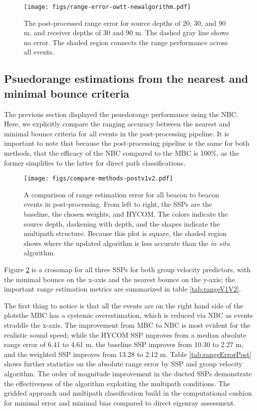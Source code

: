 \begin{figure}[!ht]
\texttt{[image: figs/range-error-owtt-newalgorithm.pdf]}
\caption{The post-processed range error for source depths of 20, 30, and 90 m, and receiver depths of 30 and 90 m. The dashed gray line shows no error. The shaded region connects the range performance across all events.}
\label{fig:rangeError}
\end{figure}

\FloatBarrier
\subsection{Psuedorange estimations from the nearest and minimal bounce criteria}

The previous section displayed the psuedorange performance using the NBC.
Here, we explicitly compare the ranging accuracy between the nearest and minimal bounce criteria for all events in the post-processing pipeline.
It is important to note that because the post-processing pipeline is the same for both methods, that the efficacy of the NBC compared to the MBC is 100\%, as the former simplifies to the latter for direct path classifications.

\begin{figure}[h!]
\texttt{[image: figs/compare-methods-postv1v2.pdf]}
\caption{\label{fig:compareV1V2}{A comparison of range estimation error for all beacon to beacon events in post-processing. From left to right, the SSPs are the baseline, the chosen weights, and HYCOM. The colors indicate the source depth, darkening with depth, and the shapes indicate the multipath structure. Because this plot is square, the shaded region shows where the updated algorithm is less accurate than the \textit{in situ} algorithm.}}
\end{figure}

Figure \ref{fig:compareV1V2} is a crossmap for all three SSPs for both group velocity predictors, with the minimal bounce on the x-axis and the nearest bounce on the y-axis; the important range estimation metrics are summarized in table \ref{tab:rangeV1V2}.

The first thing to notice is that all the events are on the right hand side of the plots\textemdash the MBC has a systemic overestimation, which is reduced via NBC as events straddle the x-axis.
The improvement from MBC to NBC is most evident for the realistic sound speed; while the HYCOM SSP improves from a median absolute range error of 6.41 to 4.61 m, the baseline SSP improves from 10.30 to 2.27 m, and the weighted SSP improves from 13.28 to 2.12 m.
Table \ref{tab:rangeErrorPost} shows further statistics on the absolute range error by SSP and group velocity algorithm.
The order of magnitude improvement in the ducted SSPs demonstrate the effectiveness of the algorithm exploiting the multipath conditions.
The gridded approach and multipath classification build in the computational cushion for minimal error and minimal bias compared to direct eigenray assessment.

